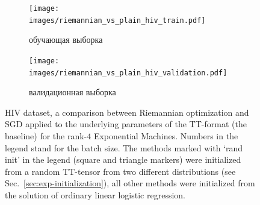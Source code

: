 \begin{figure}
    \centering
    \begin{subfigure}[b]{\textwidth}
        \texttt{[image: images/riemannian\_vs\_plain\_hiv\_train.pdf]}
        \caption{обучающая выборка}
    \end{subfigure}
    \begin{subfigure}[b]{\textwidth}
        \texttt{[image: images/riemannian\_vs\_plain\_hiv\_validation.pdf]}
        \caption{валидационная выборка}
    \end{subfigure}
    \caption{HIV dataset, a comparison between Riemannian optimization and SGD applied to the underlying parameters of the TT-format (the baseline) for the rank-$4$ Exponential Machines.
  Numbers in the legend stand for the batch size.
  The methods marked with `rand init' in the legend (square and triangle markers) were initialized from a random TT-tensor from two different distributions (see Sec.~\ref{sec:exp-initialization}), all other methods were initialized from the solution of ordinary linear logistic regression.}\label{fig:riemannian_vs_plain_hiv}
\end{figure}

